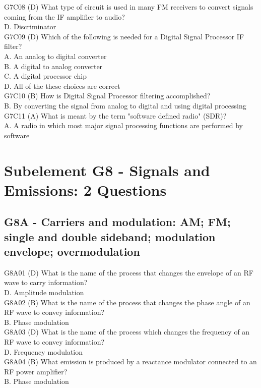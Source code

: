 \documentclass[12pt,letterpaper]{report}
\begin{document}
G7C08 (D) What type of circuit is used in many FM receivers to convert signals coming from the IF amplifier to audio?\\
D. Discriminator\\

G7C09 (D) Which of the following is needed for a Digital Signal Processor IF filter?\\
A. An analog to digital converter\\
B. A digital to analog converter\\
C. A digital processor chip\\
D. All of the these choices are correct\\

G7C10 (B) How is Digital Signal Processor filtering accomplished?\\
B. By converting the signal from analog to digital and using digital processing\\

G7C11 (A) What is meant by the term "software defined radio" (SDR)?\\
A. A radio in which most major signal processing functions are performed by software\\

\chapter{Subelement G8 - Signals and Emissions: 2 Questions}
\section{G8A - Carriers and modulation: AM; FM; single and double sideband; modulation envelope; overmodulation}

G8A01 (D) What is the name of the process that changes the envelope of an RF wave to carry information?\\
D. Amplitude modulation\\

G8A02 (B) What is the name of the process that changes the phase angle of an RF wave to convey information?\\
B. Phase modulation\\

G8A03 (D) What is the name of the process which changes the frequency of an RF wave to convey information?\\
D. Frequency modulation\\

G8A04 (B) What emission is produced by a reactance modulator connected to an RF power amplifier?\\
B. Phase modulation\\
\end{document}
